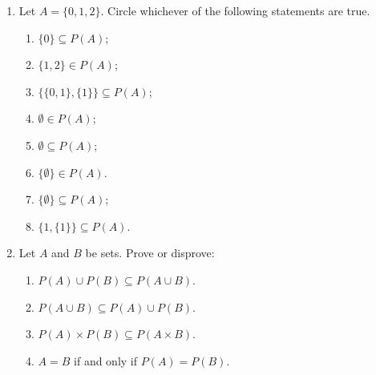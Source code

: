 \documentclass[12pt, reqno]{amsart}
\begin{document}
\begin{enumerate}
\begin{enumerate}
\item Let $A = \{0,1,2\}$. Circle whichever of the following statements
 are true.

 \begin{enumerate}
 \item $\{0\} \subseteq P(A)$;\vspace{0.3cm}
 \item $\{1,2\} \in P(A)$;\vspace{0.3cm}
 \item $\{\{0,1\},\{1\}\} \subseteq P(A)$;\vspace{0.3cm}
 \item $\emptyset \in P(A)$;\vspace{0.3cm}
 \item $\emptyset \subseteq P(A)$;\vspace{0.3cm}
 \item $\{\emptyset\} \in P(A)$. \vspace{0.3cm}
 \item $\{\emptyset\} \subseteq P(A)$;\vspace{0.3cm}
 \item $\{1,\{1\}\} \subseteq P(A)$.\\
 \end{enumerate}

\item Let $A$ and $B$ be sets. Prove or disprove:

 \begin{enumerate}
 \item $P(A) \cup P(B) \subseteq P(A \cup B)$.
 \item $P(A \cup B) \subseteq P(A) \cup P(B)$.
 \item $P(A) \times P(B) \subseteq P(A \times B)$.
 \item $A = B$ if and only if $P(A) = P(B)$.
 \end{enumerate}

\end{enumerate}



\end{enumerate}
\end{document}
